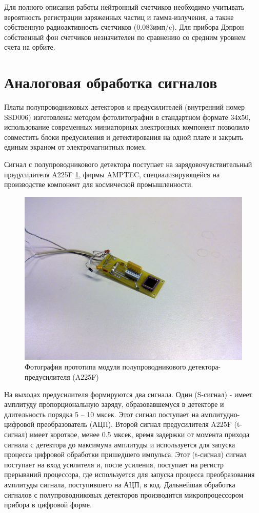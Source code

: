 Для полного описания работы нейтронный счетчиков необходимо учитывать вероятность регистрации заряженных частиц и гамма-излучения, а также собственную радиоактивность счетчиков (0.083имп/c). Для прибора Дэпрон собственный фон счетчиков незначителен по сравнению со средним уровнем счета на орбите. 

\section{Аналоговая обработка сигналов}

Платы полупроводниковых детекторов и предусилителей (внутренний номер SSD006) изготовлены методом фотолитографии в стандартном формате 34х50, использование современных миниатюрных электронных компонент позволило совместить блоки предусиления и детектирования на одной плате и закрыть единым экраном от электромагнитных помех.

	Сигнал с полупроводникового детектора поступает на зарядовочувствительный предусилителя A225F \ref{fig:a225}, фирмы AMPTEC, специализирующейся на производстве компонент для космической промышленности. 


\begin{figure}
\centering
\includegraphics[width=0.7\linewidth]{images/04062010073}
\caption{Фотография прототипа модуля полупроводникового детектора-предусилителя (A225F)}
\label{fig:a225}
\end{figure}

На выходах предусилителя формируются два сигнала. Один (S-сигнал) - имеет амплитуду пропорциональную заряду, образовавшемуся в детекторе и длительность порядка 5 -- 10 мксек. Этот сигнал поступает на амплитудно-цифровой преобразователь (АЦП). Второй сигнал предусилителя A225F (t-сигнал) имеет короткое, менее 0.5 мксек, время задержки от момента прихода сигнала с детектора до максимума амплитуды и используется для запуска процесса цифровой обработки пришедшего импульса. Этот (t-сигнал) сигнал поступает на вход усилителя и, после усиления, поступает на регистр прерываний процессора, где используется для запуска процесса преобразования амплитуды сигнала, поступившего на АЦП, в код. Дальнейшая обработка сигналов с полупроводниковых детекторов производится микропроцессором прибора в цифровой форме.

